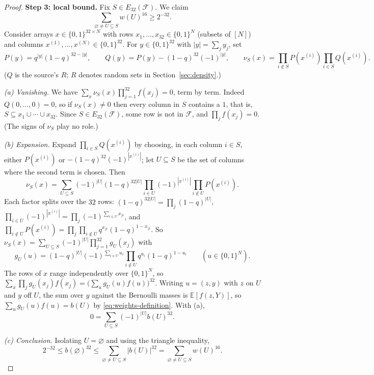 \documentclass[11pt,letterpaper]{article}
\theoremstyle{definition}
\theoremstyle{remark}
\numberwithin{equation}{section}
\newcommand{\step}[1]{\par\smallskip\noindent\textbf{#1}\enspace}
\begin{document}
\begin{proof}
\step{Step 3: local bound.}
Fix $S\in E_{32}(\mathcal F)$. We claim
\begin{equation}\label{eq:exceptional-weight-bound}
 \sum_{\varnothing\ne U\subseteq S}w(U)^{16}\ge2^{-32}.
\end{equation}
Consider arrays $x\in\{0,1\}^{32\times N}$ with rows
$x_1,\ldots,x_{32}\in\{0,1\}^N$ (subsets of $[N]$) and columns
$x^{(1)},\ldots,x^{(N)}\in\{0,1\}^{32}$. For $y\in\{0,1\}^{32}$ with
$|y|=\sum_jy_j$, set
\[
 P(y)=q^{|y|}(1-q)^{32-|y|},
 \qquad
 Q(y)=P(y)-(1-q)^{32}(-1)^{|y|},
 \qquad
 \nu_S(x)=\prod_{i\notin S}P(x^{(i)})\prod_{i\in S}Q(x^{(i)}).
\]
($Q$ is the source's $R$; $R$ denotes random sets in
Section~\ref{sec:density}.)

\emph{(a) Vanishing.} We have
$\sum_x\nu_S(x)\prod_{j=1}^{32}f(x_j)=0$, term by term. Indeed
$Q(0,\ldots,0)=0$, so if $\nu_S(x)\ne0$ then every column in $S$ contains
a $1$, that is, $S\subseteq x_1\cup\cdots\cup x_{32}$. Since
$S\in E_{32}(\mathcal F)$, some row is not in $\mathcal F$, and
$\prod_jf(x_j)=0$. (The signs of $\nu_S$ play no role.)

\emph{(b) Expansion.} Expand $\prod_{i\in S}Q(x^{(i)})$ by choosing, in
each column $i\in S$, either $P(x^{(i)})$ or
$-(1-q)^{32}(-1)^{|x^{(i)}|}$; let $U\subseteq S$ be the set of columns
where the second term is chosen. Then
\[
 \nu_S(x)=\sum_{U\subseteq S}(-1)^{|U|}(1-q)^{32|U|}
 \prod_{i\in U}(-1)^{|x^{(i)}|}\prod_{i\notin U}P(x^{(i)}).
\]
Each factor splits over the $32$ rows:
$(1-q)^{32|U|}=\prod_j(1-q)^{|U|}$,
$\prod_{i\in U}(-1)^{|x^{(i)}|}=\prod_j(-1)^{\sum_{i\in U}x_{ji}}$, and
$\prod_{i\notin U}P(x^{(i)})
=\prod_j\prod_{i\notin U}q^{x_{ji}}(1-q)^{1-x_{ji}}$.
So $\nu_S(x)=\sum_{U\subseteq S}(-1)^{|U|}\prod_{j=1}^{32}g_U(x_j)$ with
\[
 g_U(u)=(1-q)^{|U|}(-1)^{\sum_{i\in U}u_i}
 \prod_{i\notin U}q^{u_i}(1-q)^{1-u_i}
 \qquad(u\in\{0,1\}^N).
\]
The rows of $x$ range independently over $\{0,1\}^N$, so
$\sum_x\prod_jg_U(x_j)f(x_j)=\bigl(\sum_ug_U(u)f(u)\bigr)^{32}$. Writing
$u=(z,y)$ with $z$ on $U$ and $y$ off $U$, the sum over $y$ against the
Bernoulli masses is $\mathbb E[f(z,Y)]$, so $\sum_ug_U(u)f(u)=b(U)$ by
\eqref{eq:weights-definition}. With (a),
\begin{equation}\label{eq:signed-identity}
 0=\sum_{U\subseteq S}(-1)^{|U|}b(U)^{32}.
\end{equation}

\emph{(c) Conclusion.} Isolating $U=\varnothing$ and using the triangle
inequality,
\[
 2^{-32}\le b(\varnothing)^{32}
 \le\sum_{\varnothing\ne U\subseteq S}|b(U)|^{32}
 =\sum_{\varnothing\ne U\subseteq S}w(U)^{16}.
\]


\end{proof}
\end{document}
